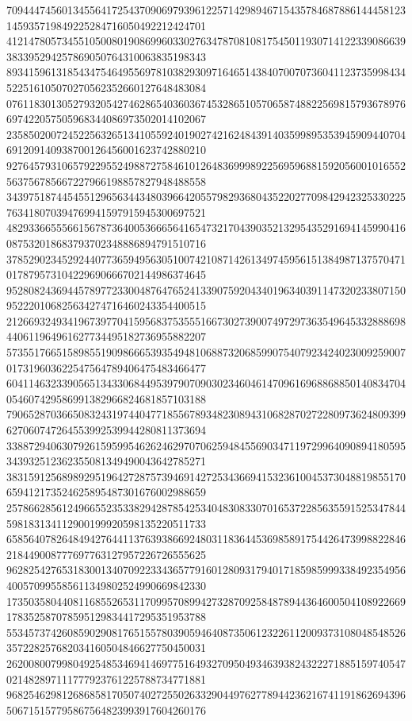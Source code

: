 \begin{DoxyCode}
      709444745601345564172543709069793961225714298946715435784687886144458123145935719849225284716050492212424701
      412147805734551050080190869960330276347870810817545011930714122339086639383395294257869050764310063835198343
      893415961318543475464955697810382930971646514384070070736041123735998434522516105070270562352660127648483084
      076118301305279320542746286540360367453286510570658748822569815793678976697422057505968344086973502014102067
      235850200724522563265134105592401902742162484391403599895353945909440704691209140938700126456001623742880210
      927645793106579229552498872758461012648369998922569596881592056001016552563756785667227966198857827948488558
      343975187445455129656344348039664205579829368043522027709842942325330225763418070394769941597915945300697521
      482933665556615678736400536665641654732170439035213295435291694145990416087532018683793702348886894791510716
      378529023452924407736594956305100742108714261349745956151384987137570471017879573104229690666702144986374645
      952808243694457897723300487647652413390759204340196340391147320233807150952220106825634274716460243354400515
      212669324934196739770415956837535551667302739007497297363549645332888698440611964961627734495182736955882207
      573551766515898551909866653935494810688732068599075407923424023009259007017319603622547564789406475483466477
      604114632339056513433068449539790709030234604614709616968868850140834704054607429586991382966824681857103188
      790652870366508324319744047718556789348230894310682870272280973624809399627060747264553992539944280811373694
      338872940630792615959954626246297070625948455690347119729964090894180595343932512362355081349490043642785271
      383159125689892951964272875739469142725343669415323610045373048819855170659412173524625895487301676002988659
      257866285612496655235338294287854253404830833070165372285635591525347844598183134112900199920598135220511733
      658564078264849427644113763938669248031183644536985891754426473998822846218449008777697763127957226726555625
      962825427653183001340709223343657791601280931794017185985999338492354956400570995585611349802524990669842330
      173503580440811685526531170995708994273287092584878944364600504108922669178352587078595129834417295351953788
      553457374260859029081765155780390594640873506123226112009373108048548526357228257682034160504846627750450031
      262008007998049254853469414697751649327095049346393824322271885159740547021482897111777923761225788734771881
      968254629812686858170507402725502633290449762778944236216741191862694396506715157795867564823993917604260176

\end{DoxyCode}
